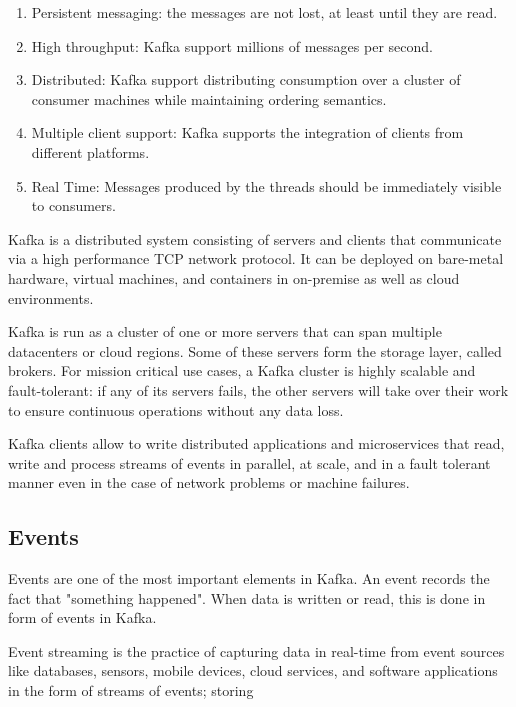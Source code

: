 \begin{enumerate}
    \item   Persistent messaging: the messages are not lost, at least until
            they are read.
    \item   High throughput: Kafka support millions of messages per second.
    \item   Distributed: Kafka support distributing consumption over a cluster
            of consumer machines while maintaining ordering semantics.
    \item   Multiple client support: Kafka supports the integration of clients
            from different platforms.
    \item   Real Time: Messages produced by the threads should be immediately
            visible to consumers.
\end{enumerate}

Kafka is a distributed system consisting of servers and clients that
communicate via a high performance TCP network protocol.  It can be deployed
on bare-metal hardware, virtual machines, and containers in on-premise as well
as cloud environments.

Kafka is run as a cluster of one or more servers that can span multiple
datacenters or cloud regions. Some of these servers form the storage layer,
called brokers. For mission critical use cases, a Kafka cluster is highly
scalable and fault-tolerant: if any of its servers fails, the other servers
will take over their work to ensure continuous operations without any data
loss.

Kafka clients allow to write distributed applications and microservices that
read, write and process streams of events in parallel, at scale, and in a fault
tolerant manner even in the case of network problems or machine failures.

\subsection{Events}

Events are one of the most important elements in Kafka.
An event records the fact that "something happened". When data is written or
read, this is done in form of events in Kafka. \cite{kafka_documentation}

Event streaming is the practice of capturing data in real-time from event
sources like databases, sensors, mobile devices, cloud services, and software
applications in the form of streams of events; storing 

